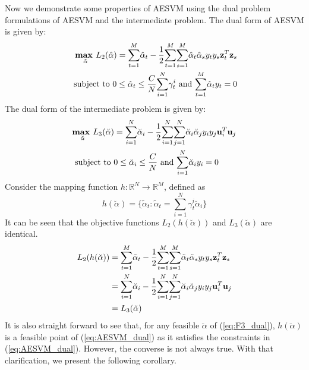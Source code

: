 \documentclass[twoside]{article}
\begin{document}
Now we demonstrate some properties of AESVM using the dual problem formulations of AESVM and the intermediate problem. The dual form of AESVM is given by:
\begin{align} \label{eq:AESVM_dual}
\underset{\bf{\hat{\alpha}}}{\textbf{max }} L_2(\hat{\alpha}) =  \overset{M}{\underset{t = 1}{\sum}}\hat{\alpha}_{t} - \frac{1}{2}\overset{M}{\underset{t = 1}{\sum}}\overset{M}{\underset{s = 1}{\sum}}\hat{\alpha}_{t}\hat{\alpha}_{s}y_{t}y_{s} {\bf z}^T _t {\bf z}_s\\
\text{ subject to } 0 \le \hat{\alpha}_t \le \frac{C}{N}\overset{N}{\underset{i = 1}\sum} \gamma^i _t \text{ and } \underset{t = 1}{\overset{M}{\sum}}\hat{\alpha}_{t}y_t = 0  \nonumber
\end{align}
The dual form of the intermediate problem is given by:
\begin{align} \label{eq:F3_dual}
&\underset{\breve{\alpha}}{\textbf{max }} L_3(\breve{\alpha}) =  \overset{N}{\underset{i = 1}{\sum}}\breve{\alpha}_{i} - \frac{1}{2}\overset{N}{\underset{i = 1}{\sum}}\overset{N}{\underset{j = 1}{\sum}}\breve{\alpha}_{i}\breve{\alpha}_{j}y_{i}y_{j}{\bf u}^T _i {\bf u}_j\\
&\text{ subject to } 0 \le \breve{\alpha}_i \le \frac{C}{N} \text{ and } \underset{i = 1}{\overset{N}{\sum}}\breve{\alpha}_{i}y_i = 0  \nonumber
\end{align}
Consider the mapping function $h: \mathbb{R}^N \rightarrow \mathbb{R}^M$, defined as
\begin{equation}\label{eq:hfunc}
h(\breve{\alpha}) = \{\tilde{\alpha}_t: \tilde{\alpha}_t = \overset{N}{\underset{i = 1}\sum} \gamma^i _t \breve{\alpha}_i\}
\end{equation}
It can be seen that the objective functions $L_2(h(\breve{\alpha}))$ and $L_3(\breve{\alpha})$ are identical.
\begin{align*}
L_2(h(\breve{\alpha})) &= \overset{M}{\underset{t = 1}{\sum}}\tilde{\alpha}_{t} - \frac{1}{2}\overset{M}{\underset{t = 1}{\sum}}\overset{M}{\underset{s = 1}{\sum}}\tilde{\alpha}_{t}\tilde{\alpha}_{s}y_{t}y_{s} {\bf z}^T _t {\bf z}_s\\
&= \overset{N}{\underset{i = 1}{\sum}}\breve{\alpha}_{i} - \frac{1}{2}\overset{N}{\underset{i = 1}{\sum}}\overset{N}{\underset{j = 1}{\sum}}\breve{\alpha}_{i}\breve{\alpha}_{j}y_{i}y_{j} {\bf u}^T _i {\bf u}_j\\
&= L_3(\breve{\alpha})
\end{align*}
It is also straight forward to see that, for any feasible $\breve{\alpha}$ of (\ref{eq:F3_dual}), $h(\breve{\alpha})$ is a feasible point of (\ref{eq:AESVM_dual}) as it satisfies the constraints in (\ref{eq:AESVM_dual}). However, the converse is not always true. With that clarification, we present the following corollary.
\end{document}
